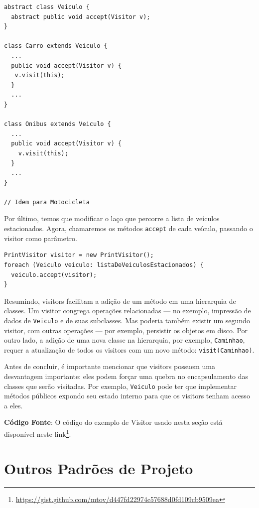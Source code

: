 \documentclass[
  11pt,
  twoside]{book}
\newcommand{\passthrough}[1]{#1}
\DeclareRobustCommand{\href}[2]{#2\footnote{\url{#1}}}
\begin{document}
\begin{lstlisting}
abstract class Veiculo {
  abstract public void accept(Visitor v);
}

class Carro extends Veiculo {
  ...
  public void accept(Visitor v) {
   v.visit(this);
  }
  ...
}

class Onibus extends Veiculo {
  ...
  public void accept(Visitor v) {
    v.visit(this);
  }
  ...
}

// Idem para Motocicleta
\end{lstlisting}

Por último, temos que modificar o laço que percorre a lista de veículos
estacionados. Agora, chamaremos os métodos
\passthrough{\lstinline!accept!} de cada veículo, passando o visitor
como parâmetro.

\begin{lstlisting}
PrintVisitor visitor = new PrintVisitor();
foreach (Veiculo veiculo: listaDeVeiculosEstacionados) {
  veiculo.accept(visitor);
}
\end{lstlisting}

Resumindo, visitors facilitam a adição de um método em uma hierarquia de
classes. Um visitor congrega operações relacionadas --- no exemplo,
impressão de dados de \passthrough{\lstinline!Veiculo!} e de suas
subclasses. Mas poderia também existir um segundo visitor, com outras
operações --- por exemplo, persistir os objetos em disco. Por outro
lado, a adição de uma nova classe na hierarquia, por exemplo,
\passthrough{\lstinline!Caminhao!}, requer a atualização de todos os
visitors com um novo método: \passthrough{\lstinline!visit(Caminhao)!}.

Antes de concluir, é importante mencionar que visitors possuem uma
desvantagem importante: eles podem forçar uma quebra no encapsulamento
das classes que serão visitadas. Por exemplo,
\passthrough{\lstinline!Veiculo!} pode ter que implementar métodos
públicos expondo seu estado interno para que os visitors tenham acesso a
eles.

\textbf{Código Fonte}: O código do exemplo de Visitor usado nesta seção
está disponível neste
\href{https://gist.github.com/mtov/d447fd22974c57688d0fd109cb9509ea}{link}.

\hypertarget{outros-padruxf5es-de-projeto}{%
\section{Outros Padrões de Projeto}\label{outros-padruxf5es-de-projeto}}

 
\end{document}
